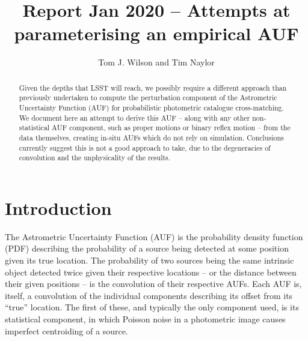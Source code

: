 \documentclass[fleqn,usenatbib]{mnras}
\title[]{Report Jan 2020 – Attempts at parameterising an empirical AUF}
\author[Tom J. Wilson and Tim Naylor]{
Tom J. Wilson
and Tim Naylor
\\
}
\date{}
\begin{document}
\label{firstpage}
\pagerange{\pageref{firstpage}--\pageref{lastpage}}
\maketitle
\begin{abstract}

Given the depths that LSST will reach, we possibly require a different approach than previously undertaken to compute the perturbation component of the Astrometric Uncertainty Function (AUF) for probabilistic photometric catalogue cross-matching. We document here an attempt to derive this AUF -- along with any other non-statistical AUF component, such as proper motions or binary reflex motion -- from the data themselves, creating in-situ AUFs which do not rely on simulation. Conclusions currently suggest this is not a good approach to take, due to the degeneracies of convolution and the unphysicality of the results.

\end{abstract}



\section{Introduction}

The Astrometric Uncertainty Function (AUF) is the probability density function (PDF) describing the probability of a source being detected at some position given its true location. The probability of two sources being the same intrinsic object detected twice given their respective locations -- or the distance between their given positions -- is the convolution of their respective AUFs. Each AUF is, itself, a convolution of the individual components describing its offset from its ``true'' location. The first of these, and typically the only component used, is its statistical component, in which Poisson noise in a photometric image causes imperfect centroiding of a source.
\end{document}

